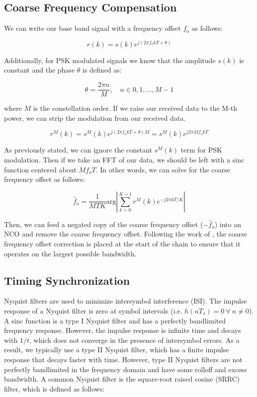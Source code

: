 \documentclass[conference,onecolumn]{IEEEtran}
\begin{document}
\subsection{Coarse Frequency Compensation}

We can write our base band signal with a frequency offset $f_o$ as follows:

\begin{equation}
	r(k) = s(k)e^{j(2{\pi}f_okT + \theta)}
\end{equation}

\noindent Additionally, for PSK modulated signals we know that the amplitude $s(k)$ is constant and the phase $\theta$ is defined as:

\begin{equation}
	\theta = \frac{2{\pi}n}{M},\quad n \in 0,1,...,M-1
\end{equation}

\noindent where $M$ is the constellation order. If we raise our received data to the M-th power, we can strip the modulation from our received data.

\begin{equation}
	r^M(k) = s^M(k)e^{j(2{\pi}f_okT + \theta)M} = s^M(k)e^{j2{\pi}Mf_okT}
\end{equation}

\noindent As previously stated, we can ignore the constant $s^M(k)$ term for PSK modulation. Then if we take an FFT of our data, we should be left with a sinc function centered about $Mf_oT$. In other words, we can solve for the coarse frequency offset as follows:

\begin{equation}
	\hat{f}_o = \frac{1}{MTK}\text{arg}\left|\sum_{k=0}^{K-1}{r^M(k)e^{-j2{\pi}kT/K}}\right|
	\label{eq::cfo_estimate}
\end{equation}

\noindent Then, we can feed a negated copy of the coarse frequency offset ($-\hat{f}_o$) into an NCO and remove the coarse frequency offset. Following the work of \cite{collins_2018_softwaredefined}, the coarse frequency offset correction is placed at the start of the chain to ensure that it operates on the largest possible bandwidth.
 
\subsection{Timing Synchronization}

Nyquist filters are used to minimize intersymbol interference (ISI). The impulse response of a Nyquist filter is zero at symbol intervals (i.e. $h(nT_s) = 0 \ \forall\ n \neq 0$). A sinc function is a type I Nyquist filter and has a perfectly bandlimited frequency response. However, the impulse response is infinite time and decays with $1/t$, which does not converge in the presence of intersymbol errors. As a result, we typically use a type II Nyquist filter, which has a finite impulse response that decays faster with time. However, type II Nyquist filters are not perfectly bandlimited in the frequency domain and have some rolloff and excess bandwidth. A common Nyquist filter is the square-root raised cosine (SRRC) filter, which is defined as follows:
 
\end{document}
